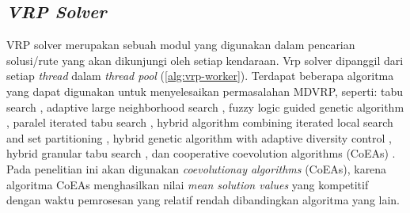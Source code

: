 \subsection{\textit{VRP Solver}}
\label{ssec:vrp-solver}
VRP solver merupakan sebuah modul yang digunakan dalam pencarian solusi/rute yang akan dikunjungi oleh setiap kendaraan. Vrp solver dipanggil dari setiap \textit{thread} dalam \textit{thread pool} (\autoref{alg:vrp-worker}). Terdapat beberapa algoritma yang dapat digunakan untuk menyelesaikan permasalahan MDVRP, seperti: tabu search \cite{cordeau_tabu_1997}, adaptive large neighborhood search  \citep{pisinger_general_2007}, fuzzy logic guided genetic algorithm \citep{lau_application_2010}, paralel iterated tabu search \citep{cordeau_parallel_2012}, hybrid algorithm combining iterated local search and set partitioning \citep{subramanian_hybrid_2013}, hybrid genetic algorithm with adaptive diversity control \citep{vidal_implicit_2014}, hybrid granular tabu search \citep{escobar_hybrid_2014}, dan cooperative coevolution algorithms (CoEAs) \citep{de_oliveira_cooperative_2016}. Pada penelitian ini akan digunakan \textit{coevolutionay algorithms} (CoEAs), karena algoritma CoEAs menghasilkan nilai \textit{mean solution values} yang kompetitif dengan waktu pemrosesan yang relatif rendah dibandingkan algoritma yang lain.


